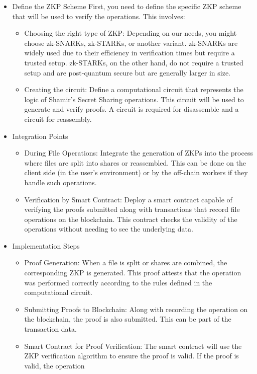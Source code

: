\documentclass{tufte-handout}
\begin{document}
\begin{itemize}
\item Define the ZKP Scheme
First, you need to define the specific ZKP scheme that will be used to verify the operations. This involves:
\begin{itemize}
\item Choosing the right type of ZKP: Depending on our needs, you might choose zk-SNARKs, zk-STARKs, or another variant. zk-SNARKs are widely used due to their efficiency
in verification times but require a trusted setup. zk-STARKs, on the other hand, do not require a trusted setup and are post-quantum secure but are generally larger in size.
\item Creating the circuit: Define a computational circuit that represents the logic of Shamir's Secret Sharing operations. This circuit will be used to generate and
verify proofs. A circuit is required for disassemble and a circuit for reassembly.
\end{itemize}
\item Integration Points
\begin{itemize}
\item During File Operations: Integrate the generation of ZKPs into the process where files are split into shares or reassembled. This can be done on the client side
(in the user's environment) or by the off-chain workers if they handle such operations.
\item Verification by Smart Contract: Deploy a smart contract capable of verifying the proofs submitted along with transactions that record file operations on the
blockchain. This contract checks the validity of the operations without needing to see the underlying data.
\end{itemize}
\item Implementation Steps
\begin{itemize}
\item Proof Generation: When a file is split or shares are combined, the corresponding ZKP is generated. This proof attests that the operation was performed correctly
according to the rules defined in the computational circuit.
\item Submitting Proofs to Blockchain: Along with recording the operation on the blockchain, the proof is also submitted. This can be part of the transaction data.
\item Smart Contract for Proof Verification: The smart contract will use the ZKP verification algorithm to ensure the proof is valid. If the proof is valid, the operation

\end{itemize}
\end{itemize}
\end{document}

